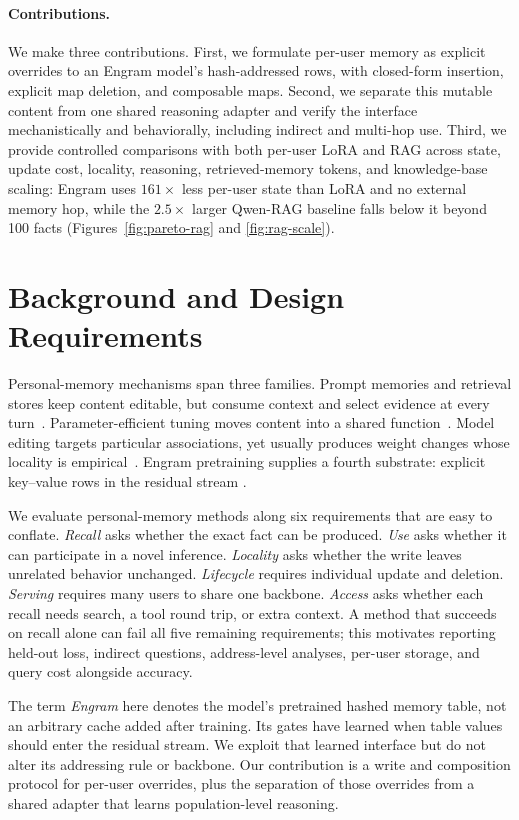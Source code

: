 \documentclass[letterpaper]{article} %
\begin{document}
\paragraph{Contributions.}
We make three contributions. First, we formulate per-user memory as explicit
overrides to an Engram model's hash-addressed rows, with closed-form insertion,
explicit map deletion, and composable maps. Second, we separate this mutable
content from one shared reasoning adapter and verify the interface
mechanistically and behaviorally, including indirect and multi-hop use. Third,
we provide controlled comparisons with both per-user LoRA and RAG across state,
update cost, locality, reasoning, retrieved-memory tokens, and knowledge-base
scaling: Engram uses $161\times$ less per-user state than LoRA and no external
memory hop, while the $2.5\times$ larger Qwen-RAG baseline falls below it beyond
100 facts (Figures~\ref{fig:pareto-rag} and \ref{fig:rag-scale}).

\section{Background and Design Requirements}

Personal-memory mechanisms span three families. Prompt memories and retrieval
stores keep content editable, but consume context and select evidence at every
turn~\citep{lewis2020rag,gao2023ragsurvey}. Parameter-efficient tuning moves
content into a shared function~\citep{hu2022lora}. Model editing targets
particular associations, yet usually produces weight changes whose locality is
empirical~\citep{meng2022rome,meng2023memit}. Engram pretraining supplies a
fourth substrate: explicit key--value rows in the residual stream
\citep{cheng2026engram}.

We evaluate personal-memory methods along six requirements that are easy to
conflate. \emph{Recall}
asks whether the exact fact can be produced. \emph{Use} asks whether it can
participate in a novel inference. \emph{Locality} asks whether the write leaves
unrelated behavior unchanged. \emph{Lifecycle} requires individual update and
deletion. \emph{Serving} requires many users to share one backbone. \emph{Access}
asks whether each recall needs search, a tool round trip, or extra context. A method
that succeeds on recall alone can fail all five remaining requirements; this
motivates reporting held-out loss, indirect questions, address-level analyses,
per-user storage, and query cost alongside accuracy.

The term \emph{Engram} here denotes the model's pretrained hashed memory table,
not an arbitrary cache added after training. Its gates have learned when table
values should enter the residual stream. We exploit that learned interface but
do not alter its addressing rule or backbone. Our contribution is a write and
composition protocol for per-user overrides, plus the separation of those
overrides from a shared adapter that learns population-level reasoning.
\end{document}
